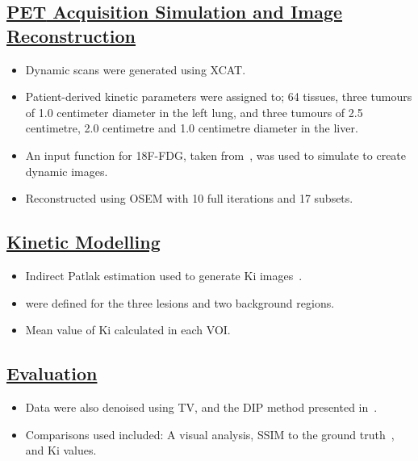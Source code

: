 \documentclass[portrait, color=UCLburgundy, margin=1cm]{uclposter}
\begin{document}
\begin{multicols}{2}
            \subsection*{\underline{\textbf{\acrshort{PET} Acquisition Simulation and Image Reconstruction}}}
                \begin{itemize}
                    \item Dynamic scans were generated using \acrshort{XCAT}.
                    \item Patient-derived kinetic parameters were assigned to; 64 tissues, three tumours of 1.0 centimeter diameter in the left lung, and three tumours of 2.5 centimetre, 2.0 centimetre and 1.0 centimetre diameter in the liver.
                    \item An input function for \acrshort{18F-FDG}, taken from~\cite{langsjoEffectsSubanestheticKetamine2004}, was used to simulate  to create dynamic images.
                    \item Reconstructed using \gls{OSEM} with 10 full iterations and 17 subsets.
                \end{itemize}
            
            \subsection*{\underline{\textbf{Kinetic Modelling}}}
                \begin{itemize}
                    \item Indirect Patlak estimation used to generate Ki images~\cite{patlak1983GraphicalEvaluationBloodtoBrain}.
                    \item {} were defined for the three lesions and two background regions.
                    \item Mean value of Ki calculated in each \gls{VOI}.
                \end{itemize}
            
            \subsection*{\underline{\textbf{Evaluation}}}
                \begin{itemize}
                    \item Data were also denoised using \gls{TV}, and the \gls{DIP} method presented in~\cite{Gong2019PETPrior}.
                    \item Comparisons used included: A visual analysis, \gls{SSIM} to the ground truth~\cite{Wang2009MeanMeasures}, and Ki values.
                \end{itemize}
        

\end{multicols}
\end{document}
